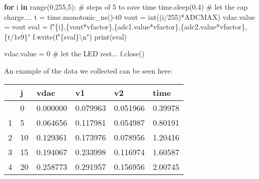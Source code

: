 \documentclass[
  letterpaper,
  DIV=11,
  numbers=noendperiod]{scrartcl}
\newenvironment{Shaded}{\begin{snugshade}}{\end{snugshade}}
\newcommand{\BuiltInTok}[1]{\textcolor[rgb]{0.00,0.23,0.31}{#1}}
\newcommand{\CharTok}[1]{\textcolor[rgb]{0.13,0.47,0.30}{#1}}
\newcommand{\CommentTok}[1]{\textcolor[rgb]{0.37,0.37,0.37}{#1}}
\newcommand{\ControlFlowTok}[1]{\textcolor[rgb]{0.00,0.23,0.31}{\textbf{#1}}}
\newcommand{\DecValTok}[1]{\textcolor[rgb]{0.68,0.00,0.00}{#1}}
\newcommand{\FloatTok}[1]{\textcolor[rgb]{0.68,0.00,0.00}{#1}}
\newcommand{\KeywordTok}[1]{\textcolor[rgb]{0.00,0.23,0.31}{\textbf{#1}}}
\newcommand{\NormalTok}[1]{\textcolor[rgb]{0.00,0.23,0.31}{#1}}
\newcommand{\OperatorTok}[1]{\textcolor[rgb]{0.37,0.37,0.37}{#1}}
\newcommand{\SpecialCharTok}[1]{\textcolor[rgb]{0.37,0.37,0.37}{#1}}
\newcommand{\SpecialStringTok}[1]{\textcolor[rgb]{0.13,0.47,0.30}{#1}}
\begin{document}
\begin{Shaded}
\begin{Highlighting}[]
\ControlFlowTok{for}\NormalTok{ i }\KeywordTok{in} \BuiltInTok{range}\NormalTok{(}\DecValTok{0}\NormalTok{,}\DecValTok{255}\NormalTok{,}\DecValTok{5}\NormalTok{): }\CommentTok{\# steps of 5 to save time}
\NormalTok{    time.sleep(}\FloatTok{0.4}\NormalTok{) }\CommentTok{\# let the cap charge....}
\NormalTok{    t }\OperatorTok{=}\NormalTok{ time.monotonic\_ns()}\OperatorTok{{-}}\NormalTok{t0}
\NormalTok{    vout }\OperatorTok{=} \BuiltInTok{int}\NormalTok{((i}\OperatorTok{/}\DecValTok{255}\NormalTok{)}\OperatorTok{*}\NormalTok{ADCMAX)}
\NormalTok{    vdac.value }\OperatorTok{=}\NormalTok{ vout}
\NormalTok{    sval }\OperatorTok{=} \SpecialStringTok{f"}\SpecialCharTok{\{}\NormalTok{i}\SpecialCharTok{\}}\SpecialStringTok{,}\SpecialCharTok{\{}\NormalTok{vout}\OperatorTok{*}\NormalTok{vfactor}\SpecialCharTok{\}}\SpecialStringTok{,}\SpecialCharTok{\{}\NormalTok{adc1}\SpecialCharTok{.}\NormalTok{value}\OperatorTok{*}\NormalTok{vfactor}\SpecialCharTok{\}}\SpecialStringTok{,}\SpecialCharTok{\{}\NormalTok{adc2}\SpecialCharTok{.}\NormalTok{value}\OperatorTok{*}\NormalTok{vfactor}\SpecialCharTok{\}}\SpecialStringTok{,}\SpecialCharTok{\{}\NormalTok{t}\OperatorTok{/}\FloatTok{1e9}\SpecialCharTok{\}}\SpecialStringTok{"}
\NormalTok{    f.write(}\SpecialStringTok{f"}\SpecialCharTok{\{}\NormalTok{sval}\SpecialCharTok{\}}\CharTok{\textbackslash{}n}\SpecialStringTok{"}\NormalTok{)}
    \BuiltInTok{print}\NormalTok{(sval)}

\NormalTok{vdac.value }\OperatorTok{=} \DecValTok{0} \CommentTok{\# let the LED rest...}
\NormalTok{f.close()}
\end{Highlighting}
\end{Shaded}

An example of the data we collected can be seen here:

\begin{longtable}[]{@{}llllll@{}}
\toprule\noalign{}
& j & vdac & v1 & v2 & time \\
\midrule\noalign{}
\endhead
\bottomrule\noalign{}
\endlastfoot
0 & 0 & 0.000000 & 0.079963 & 0.051966 & 0.39978 \\
1 & 5 & 0.064656 & 0.117981 & 0.054987 & 0.80191 \\
2 & 10 & 0.129361 & 0.173976 & 0.078956 & 1.20416 \\
3 & 15 & 0.194067 & 0.233998 & 0.116974 & 1.60587 \\
4 & 20 & 0.258773 & 0.291957 & 0.156956 & 2.00745 \\
\end{longtable}
\end{document}
